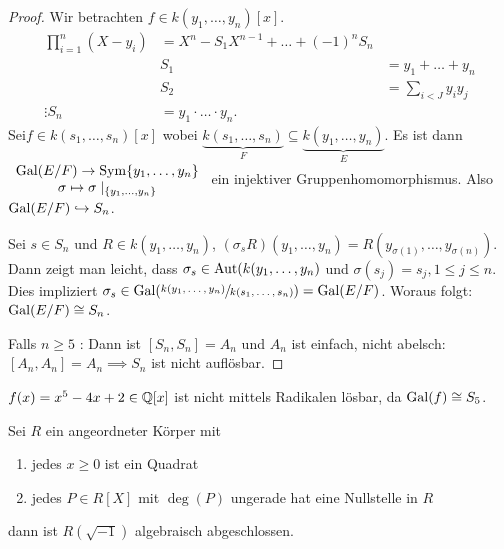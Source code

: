 \begin{proof}
	Wir betrachten $f \in k(y_1,\ldots,y_{n})[x]$.
	\begin{align*}
		\prod_{i=1}^{n} (X-y_{i}) &= X^{n}-S_1 X^{n-1} + \ldots + (-1)^{n} S_{n}\\
		&S_1 &= y_1+\ldots+y_{n}\\
		&S_2 &= \sum_{i<J} y_i y_{j}\\
		\vdots
		S_{n} &= y_1 \cdot \ldots \cdot y_{n}
	.\end{align*}
	Sei$f \in k(s_1,\ldots,s_{n})[x]$ wobei $\underbrace{k(s_1,\ldots,s_{n})}_{F} \subseteq \underbrace{k(y_1,\ldots,y_{n})}_{E}$.
	Es ist dann $\begin{array}{c} \operatorname{Gal}(E/F) \to \operatorname{Sym} \{y_1,\ldots,y_{n}\}\\ \sigma \mapsto \sigma \mid_{\{y_1,\ldots,y_{n}\}}\\ \end{array}$ ein injektiver Gruppenhomomorphismus.
	Also $\operatorname{Gal}(E /F) \hookrightarrow S_{n}$.

	Sei $s \in S_{n}$ und $R \in k(y_1,\ldots,y_{n})$, $(\sigma_{s}R)(y_1,\ldots,y_{n}) = R(y_{\sigma(1)},\ldots,y_{\sigma(n)})$.
	Dann zeigt man leicht, dass $\sigma_{s} \in \operatorname{Aut}(k(y_1,\ldots,y_{n})$ und $\sigma(s_{j}) = s_{j}, 1 \leq j \leq n$.
	Dies impliziert $\sigma_{s} \in \operatorname{Gal}(\sfrac{k(y_1,\ldots,y_{n})}{k(s_1,\ldots,s_{n})}) = \operatorname{Gal}(E / F)$.
	Woraus folgt: $\operatorname{Gal}(E / F) \cong S_{n}$.

	Falls $n \geq 5$ : Dann ist  $[S_{n}, S_{n}] = A_{n}$ und $A_{n}$ ist einfach, nicht abelsch: $[A_{n}, A_{n}] = A_{n} \implies S_{n}$ ist nicht auflösbar.
\end{proof}

\begin{corollary}
	$f(x) = x^{5} - 4x + 2 \in \mathbb{Q}[x]$ ist nicht mittels Radikalen lösbar, da $\operatorname{Gal}(f) \cong S_{5}$.
\end{corollary}

Sei $R$ ein angeordneter Körper mit
\begin{enumerate}
	\item jedes $x \geq 0$ ist ein Quadrat
	\item jedes $P \in R[X]$ mit  $\deg(P)$ ungerade hat eine Nullstelle in $R$
\end{enumerate}
dann ist $R(\sqrt{-1})$ algebraisch abgeschlossen.





























